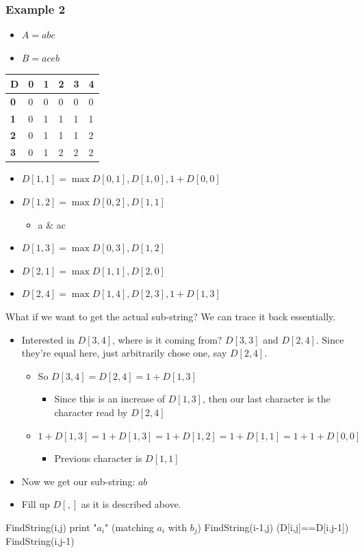 \documentclass[11pt]{article}
\begin{document}
\subsubsection{Example 2}
\label{sec:org233108a}
\begin{itemize}
\item \(A=abc\)
\item \(B=aceb\)
\end{itemize}
\begin{tabular}{l | l | l | l | l | l}
  \textbf{D} & \textbf{0} &\textbf{1} &\textbf{2} &\textbf{3}& \textbf{4}
  \\ \hline \textbf{0} & 0 & 0 & 0 & 0 & 0
  \\ \hline \textbf{1} & 0 & 1 & 1 & 1 & 1 
  \\ \hline \textbf{2} & 0 & 1 & 1 & 1 & 2
  \\ \hline \textbf{3} & 0 & 1 & 2 & 2 & 2
\end{tabular}
\begin{itemize}
\item \(D[1,1] = \max{D[0,1],D[1,0],1+D[0,0]}\)
\item \(D[1,2] = \max{D[0,2],D[1,1]}\)
\begin{itemize}
\item a \& ac
\end{itemize}
\item \(D[1,3] = \max{D[0,3],D[1,2]}\)
\item \(D[2,1] = \max{D[1,1],D[2,0]}\)
\item \(D[2,4] = \max{D[1,4],D[2,3],1+D[1,3]}\)
\end{itemize}
What if we want to get the actual sub-string? We can trace it back essentially. 
\begin{itemize}
\item Interested in \(D[3,4]\), where is it coming from? \(D[3,3]\) and \(D[2,4]\). Since they're equal here, just arbitrarily chose one, say \(D[2,4]\).
\begin{itemize}
\item So \(D[3,4]=D[2,4] = 1+D[1,3]\)
\begin{itemize}
\item Since this is an increase of \(D[1,3]\), then our last character is the character read by \(D[2,4]\)
\end{itemize}
\item \(1+D[1,3] = 1+D[1,3] = 1+D[1,2] =1+D[1,1]=1+1+D[0,0]\)
\begin{itemize}
\item Previous character is \(D[1,1]\)
\end{itemize}
\end{itemize}
\item Now we get our sub-string: \(ab\)
\item Fill up \(D[,]\) as it is described above.
\end{itemize}
\begin{algorithmic}
\State FindString(i,j)
    \State print "$a_i$" (matching $a_i$ with $b_j$)
\Else
	    \State FindString(i-1,j)
	\Else (D[i,j]==D[i.j-1])
	      \State FindString(i,j-1)
	\EndIf
\EndIf
\end{algorithmic}
\end{document}

